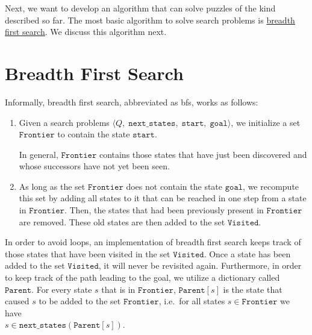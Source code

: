 Next, we want to develop an algorithm that can solve puzzles of the kind described so far.  The most basic
algorithm to solve search problems is \href{https://en.wikipedia.org/wiki/Breadth-first_search}{breadth first search}.
We discuss this algorithm next.

\section{Breadth First Search}
Informally, breadth first search, abbreviated as \ac{bfs}, works as follows: 
\begin{enumerate}
\item Given a search problems $\langle Q,\;\mathtt{next\_states},\; \mathtt{start},\; \mathtt{goal}\rangle$,
      we initialize a set $\texttt{Frontier}$ to contain the state $\texttt{start}$.

      In general, $\texttt{Frontier}$ contains those states that have just been discovered and whose successors have not
      yet been seen.
\item As long as the set $\texttt{Frontier}$ does not contain the state $\texttt{goal}$, we recompute this set
      by adding all states to it that can be reached in one step from a state in $\texttt{Frontier}$.
      Then, the states that had been previously present in $\texttt{Frontier}$ are removed.
      These old states are then added to the set $\texttt{Visited}$.
\end{enumerate}
In order to avoid loops, an implementation of breadth first search keeps track of those states that have
been visited in the set $\texttt{Visited}$.  Once a state has been added to
the set $\texttt{Visited}$,  it will never be revisited again.
Furthermore, in order to keep track of the path leading to the goal, we utilize a dictionary called
$\texttt{Parent}$.  For every state $s$ that is in $\texttt{Frontier}$, $\mathtt{Parent}[s]$ is the state that
caused $s$ to be added to the set $\texttt{Frontier}$, i.e.~for all states $s\in\mathtt{Frontier}$ 
we have 
\\[0.2cm]
\hspace*{1.3cm}
$s \in \mathtt{next\_states}(\mathtt{Parent}[s])$.


